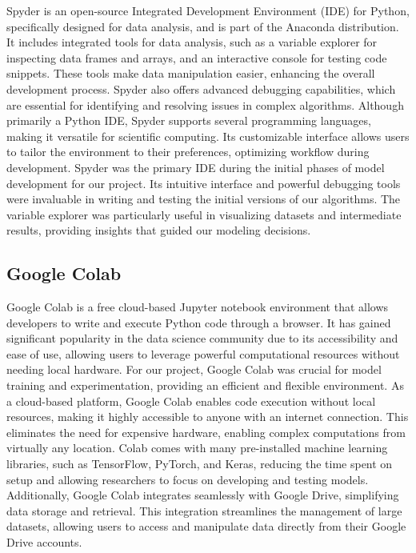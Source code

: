 Spyder is an open-source Integrated Development Environment (IDE) for Python, specifically designed for data analysis, and is part of the Anaconda distribution. It includes integrated tools for data analysis, such as a variable explorer for inspecting data frames and arrays, and an interactive console for testing code snippets. These tools make data manipulation easier, enhancing the overall development process. Spyder also offers advanced debugging capabilities, which are essential for identifying and resolving issues in complex algorithms. Although primarily a Python IDE, Spyder supports several programming languages, making it versatile for scientific computing. Its customizable interface allows users to tailor the environment to their preferences, optimizing workflow during development. Spyder was the primary IDE during the initial phases of model development for our project. Its intuitive interface and powerful debugging tools were invaluable in writing and testing the initial versions of our algorithms. The variable explorer was particularly useful in visualizing datasets and intermediate results, providing insights that guided our modeling decisions.


\subsection{Google Colab}

Google Colab is a free cloud-based Jupyter notebook environment that allows developers to write and execute Python code through a browser. It has gained significant popularity in the data science community due to its accessibility and ease of use, allowing users to leverage powerful computational resources without needing local hardware. For our project, Google Colab was crucial for model training and experimentation, providing an efficient and flexible environment. As a cloud-based platform, Google Colab enables code execution without local resources, making it highly accessible to anyone with an internet connection. This eliminates the need for expensive hardware, enabling complex computations from virtually any location. Colab comes with many pre-installed machine learning libraries, such as TensorFlow, PyTorch, and Keras, reducing the time spent on setup and allowing researchers to focus on developing and testing models. Additionally, Google Colab integrates seamlessly with Google Drive, simplifying data storage and retrieval. This integration streamlines the management of large datasets, allowing users to access and manipulate data directly from their Google Drive accounts.

